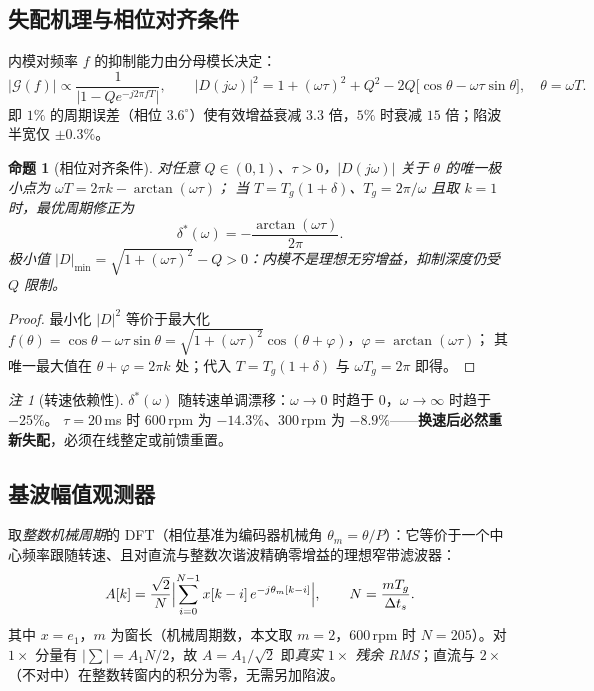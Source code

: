 \documentclass[11pt,a4paper]{article}
\newtheorem{proposition}{命题}
\theoremstyle{remark}\newtheorem{remark}{注}
\begin{document}
\subsection{失配机理与相位对齐条件}\label{sec:tes-phase}
内模对频率 $f$ 的抑制能力由分母模长决定：
\begin{equation}
\bigl|\mathcal G(f)\bigr|\propto\frac{1}{\bigl|1-Qe^{-j2\pi fT}\bigr|},
\qquad
\bigl|D(j\omega)\bigr|^{2}=1+(\omega\tau)^{2}+Q^{2}-2Q\bigl[\cos\theta-\omega\tau\sin\theta\bigr],\quad \theta=\omega T .
\label{eq:tes-D}
\end{equation}
即 $1\%$ 的周期误差（相位 $3.6^{\circ}$）使有效增益衰减 $3.3$ 倍，$5\%$ 时衰减 $15$ 倍；陷波半宽仅 $\pm0.3\%$。
\begin{proposition}[相位对齐条件]\label{prop:tes-phase}
对任意 $Q\in(0,1)$、$\tau>0$，$|D(j\omega)|$ 关于 $\theta$ 的唯一极小点为 $\omega T=2\pi k-\arctan(\omega\tau)$；
当 $T=T_g(1+\delta)$、$T_g=2\pi/\omega$ 且取 $k=1$ 时，最优周期修正为
\begin{equation}
\delta^{*}(\omega)=-\frac{\arctan(\omega\tau)}{2\pi}.
\label{eq:tes-dstar}
\end{equation}
极小值 $|D|_{\min}=\sqrt{1+(\omega\tau)^{2}}-Q>0$：内模不是理想无穷增益，抑制深度仍受 $Q$ 限制。
\end{proposition}
\begin{proof}
最小化 $|D|^{2}$ 等价于最大化 $f(\theta)=\cos\theta-\omega\tau\sin\theta=\sqrt{1+(\omega\tau)^{2}}\cos(\theta+\varphi)$，$\varphi=\arctan(\omega\tau)$；
其唯一最大值在 $\theta+\varphi=2\pi k$ 处；代入 $T=T_g(1+\delta)$ 与 $\omega T_g=2\pi$ 即得。
\end{proof}
\begin{remark}[转速依赖性]\label{rem:tes-speed}
$\delta^{*}(\omega)$ 随转速单调漂移：$\omega\to0$ 时趋于 $0$，$\omega\to\infty$ 时趋于 $-25\%$。
$\tau=20$\,ms 时 600\,rpm 为 $-14.3\%$、300\,rpm 为 $-8.9\%$——\textbf{换速后必然重新失配}，必须在线整定或前馈重置。
\end{remark}

\subsection{基波幅值观测器}\label{sec:tes-obs}
取\emph{整数机械周期}的 DFT（相位基准为编码器机械角 $\theta_m=\theta/P$）：它等价于一个中心频率跟随转速、且对直流与整数次谐波精确零增益的理想窄带滤波器：
\begin{equation}
A[k]=\frac{\sqrt{2}}{N}\Bigl|\sum_{i=0}^{N-1}x[k-i]\,e^{-j\theta_m[k-i]}\Bigr|,
\qquad N=\frac{mT_g}{\Delta t_s}.
\label{eq:tes-amp}
\end{equation}
其中 $x=e_1$，$m$ 为窗长（机械周期数，本文取 $m=2$，600\,rpm 时 $N=205$）。对 $1\times$ 分量有 $\bigl|\sum\bigr|=A_1N/2$，故 $A=A_1/\sqrt{2}$ 即\emph{真实 $1\times$ 残余 RMS}；直流与 $2\times$（不对中）在整数转窗内的积分为零，无需另加陷波。
\end{document}
